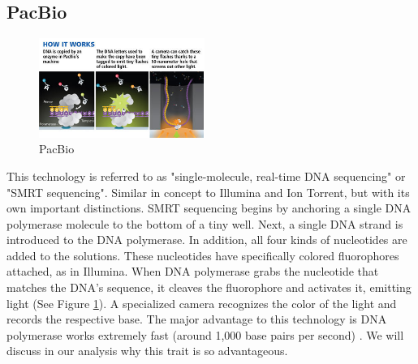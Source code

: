\documentclass[12pt,letterpaper]{report}
\begin{document}
\subsection{PacBio}

\begin{figure}
\vspace{-20pt}
  \begin{center}
    \includegraphics[width=0.48\textwidth]{pacbio_fig.png}
  \end{center}
  \vspace{-20pt}
  \caption{PacBio}
  \vspace{-10pt}
  \label{fig:pacbio}
\end{figure}

This technology is referred to as "single-molecule, real-time DNA sequencing" or "SMRT sequencing". Similar in concept to Illumina and Ion Torrent, but with its own important distinctions. SMRT sequencing begins by anchoring a single DNA polymerase molecule to the bottom of a tiny well. Next, a single DNA strand is introduced to the DNA polymerase. In addition, all four kinds of nucleotides are added to the solutions. These nucleotides have specifically colored fluorophores attached, as in Illumina. When DNA polymerase grabs the nucleotide that matches the DNA's sequence, it cleaves the fluorophore and activates it, emitting light (See Figure \ref{fig:pacbio}). A specialized camera recognizes the color of the light and records the respective base. The major advantage to this technology is DNA polymerase works extremely fast (around 1,000 base pairs per second) \cite{kelman}. We will discuss in our analysis why this trait is so advantageous.
\end{document}
